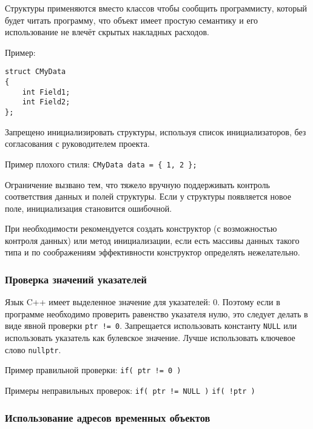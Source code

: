 {{{Структуры применяются вместо классов чтобы сообщить программисту, который будет читать программу, что объект имеет простую семантику и его использование не влечёт скрытых накладных расходов.

Пример:

\begin{lstlisting}[frame=single]
struct СMyData
{
    int Field1;
    int Field2;
};
\end{lstlisting}

Запрещено инициализировать структуры, используя список инициализаторов, без согласования с руководителем проекта.

Пример плохого стиля: \lstinline|CMyData data = { 1, 2 };|

Ограничение вызвано тем, что тяжело вручную поддерживать контроль соответствия данных и полей структуры. Если у структуры появляется новое поле, инициализация становится ошибочной.

При необходимости рекомендуется создать конструктор (с возможностью контроля данных) или метод инициализации, если есть массивы данных такого типа и по соображениям эффективности конструктор определять нежелательно.

\subsubsection{Проверка значений указателей}

Язык C++ имеет выделенное значение для указателей: 0. Поэтому если в программе необходимо проверить равенство указателя нулю, это следует делать в виде явной проверки \lstinline|ptr != 0|. Запрещается использовать константу \lstinline|NULL| или использовать указатель как булевское значение. Лучше использовать ключевое слово \lstinline|nullptr|.

Пример правильной проверки:
\newline \lstinline|if( ptr != 0 )|

Примеры неправильных проверок:
\newline \lstinline|if( ptr != NULL )|
\newline \lstinline|if( !ptr )|

\subsubsection{Использование адресов временных объектов}

}}}
